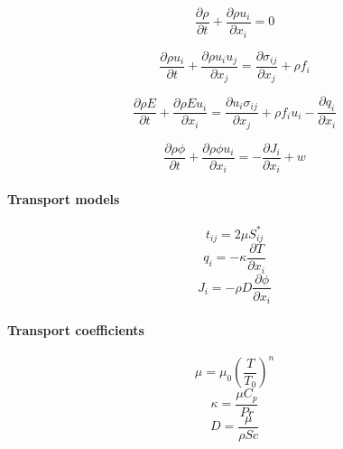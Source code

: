 \documentclass[oneside,a4paper,11pt]{report}
\begin{document}
\begin{equation*}
    \frac{\partial \rho}{\partial t} + \frac{\partial \rho u_i}{\partial x_i} = 0
\end{equation*}

\begin{equation*}
\frac{\partial \rho u_i}{\partial t} + \frac{\partial \rho u_i u_j}{\partial x_j} = \frac{\partial \sigma_{ij}}{\partial x_j} + \rho f_i
\end{equation*}

\begin{equation*}
\frac{\partial \rho E}{\partial t} + \frac{\partial \rho E u_i}{\partial x_i} = \frac{\partial u_i \sigma_{ij}}{\partial x_j} + \rho f_i u_i -  \frac{\partial q_i}{\partial x_i}
\end{equation*}

\begin{equation*}
    \frac{\partial\rho \phi}{\partial t}+\frac{\partial \rho \phi u_i}{\partial x_i} = -\frac{\partial J_i}{\partial x_i} + w
\end{equation*}

\paragraph{Transport models} 

\begin{equation*}
    t_{ij} = 2\mu S_{ij}^*
\end{equation*}
\begin{equation*}
    q_i = -\kappa \frac{\partial T}{\partial x_i}
\end{equation*}
\begin{equation*}
    J_i = -\rho D \frac{\partial \phi}{\partial x_i}
\end{equation*}

\paragraph{Transport coefficients}

\begin{equation*}
    \mu = \mu_0 \left ( \frac{T}{T_0} \right )^n
\end{equation*}
\begin{equation*}
    \kappa = \frac{\mu C_p}{Pr}
\end{equation*}
\begin{equation*}
    D = \frac{\mu}{\rho Sc}
\end{equation*}
\end{document}
